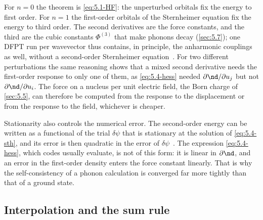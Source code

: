 For $n = 0$ the theorem is \cref{eq:5.1-HF}: the unperturbed orbitals fix the energy to first order. For $n = 1$ the first-order orbitals of the Sternheimer equation fix the energy to third order. The second derivatives are the force constants, and the third are the cubic constants $\Phi^{(3)}$ that make phonons decay (\cref{sec:5.7}); one DFPT run per wavevector thus contains, in principle, the anharmonic couplings as well, without a second-order Sternheimer equation~\cite[Eq.~(123)]{baroni2001phonons}. For two different perturbations the same reasoning shows that a mixed second derivative needs the first-order response to only one of them, as \cref{eq:5.4-hess} needed $\partial\nd/\partial u_j$ but not $\partial\nd/\partial u_i$. The force on a nucleus per unit electric field, the Born charge of \cref{sec:5.5}, can therefore be computed from the response to the displacement or from the response to the field, whichever is cheaper.

Stationarity also controls the numerical error. The second-order energy can be written as a functional of the trial $\delta\psi$ that is stationary at the solution of \cref{eq:5.4-sth}, and its error is then quadratic in the error of $\delta\psi$~\cite[Sect.~II.C.3]{baroni2001phonons}. The expression \cref{eq:5.4-hess}, which codes usually evaluate, is not of this form: it is linear in $\partial\nd$, and an error in the first-order density enters the force constant linearly. That is why the self-consistency of a phonon calculation is converged far more tightly than that of a ground state.

\subsection{Interpolation and the sum rule}

